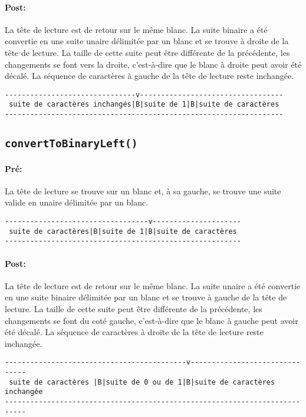 \documentclass[a4paper,11pt]{article}
\begin{document}
\paragraph{Post:}
La tête de lecture est de retour sur le même blanc. La suite binaire a été convertie en une suite unaire délimitée par un blanc et se trouve à droite de la tête de lecture.
La taille de cette suite peut être différente de la précédente, les changements se font vers la droite, c'est-à-dire que le blanc à droite peut avoir été décalé. La séquence de caractères à gauche de la tête de lecture reste inchangée.
\begin{verbatim}
-------------------------------v----------------------------------
 suite de caractères inchangés|B|suite de 1|B|suite de caractères
------------------------------------------------------------------
\end{verbatim}
\subsection{\texttt{convertToBinaryLeft()}}
\paragraph{Pré:}
La tête de lecture se trouve sur un blanc et, à sa gauche, se trouve une suite valide en unaire délimitée par un blanc.
\begin{verbatim}
----------------------------------v---------------------
 suite de caractères|B|suite de 1|B|suite de caractères
--------------------------------------------------------
\end{verbatim}
\paragraph{Post:}
La tête de lecture est de retour sur le même blanc. La suite unaire a été convertie en une suite binaire délimitée par un blanc et se trouve à gauche de la tête de lecture.
La taille de cette suite peut être différente de la précédente, les changements se font du coté gauche, c'est-à-dire que le blanc à gauche peut avoir été décalé. La séquence de caractères à droite de la tête de lecture reste inchangée.
\begin{verbatim}
-------------------------------------------v-------------------------------
 suite de caractères |B|suite de 0 ou de 1|B|suite de caractères inchangée
---------------------------------------------------------------------------
\end{verbatim}
\end{document}
